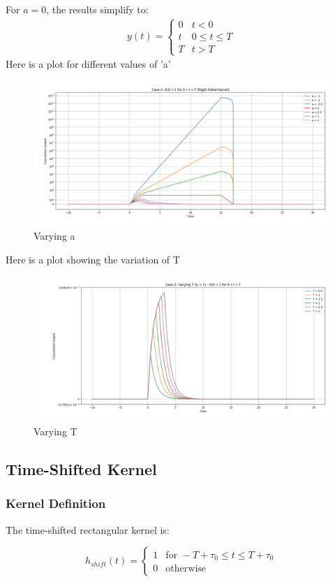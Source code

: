 For $a = 0$, the results simplify to:
\begin{align}
y(t) = 
\begin{cases}
0 & t < 0 \\
t & 0 \leq t \leq T \\
T & t > T
\end{cases}
\end{align}
 Here is a plot for different values of 'a'
 \begin{figure}[H]
     \centering
     \includegraphics[width=0.8\linewidth]{codes/codes_exp/plotseax/right side kernelvaryinga.png}
     \caption{Varying a}
     \label{fig:enter-label}
 \end{figure}
 Here is a plot showing the variation of T
 \begin{figure}[H]
     \centering
     \includegraphics[width=0.8\linewidth]{codes/codes_exp/plotseax/right side kernelvaryingT.png}
     \caption{Varying T}
     \label{fig:enter-label}
 \end{figure}
\subsection{Time-Shifted Kernel}
\subsubsection{Kernel Definition}
The time-shifted rectangular kernel is:

\begin{equation}
h_{shift}(t) = 
\begin{cases} 
1 & \text{for } -T+\tau_0 \leq t \leq T+\tau_0 \\
0 & \text{otherwise}
\end{cases}
\end{equation}

